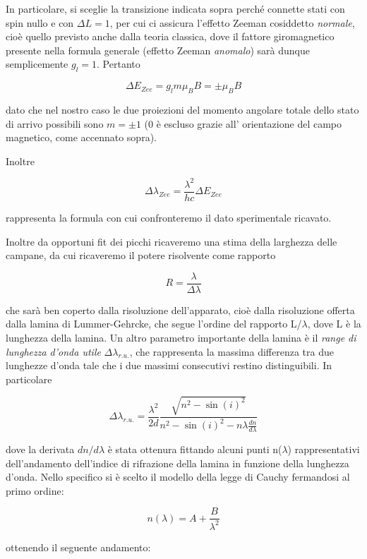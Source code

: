 \documentclass{article}
\begin{document}
	In particolare, si sceglie la transizione indicata sopra perché connette
	stati con spin nullo e con $\Delta L = 1$, per cui ci assicura l'effetto
	Zeeman cosiddetto \textit{normale}, cioè quello previsto anche dalla 
	teoria classica, dove il fattore giromagnetico presente nella formula 
	generale (effetto Zeeman \textit{anomalo}) sarà dunque semplicemente
	$g_l = 1$. Pertanto
	
	\[
	\Delta E_{Zee} = g_l m \mu_B B = \pm \mu_B B
	\]
	
	dato che nel nostro caso le due proiezioni del momento angolare totale
	dello stato di arrivo possibili sono $m = \pm 1$ (0 è escluso grazie all'
	orientazione del campo magnetico, come accennato sopra).
	
	Inoltre
	
	\[
	\Delta\lambda_{Zee} = \frac{\lambda^2}{hc}\Delta E_{Zee}
	\]
	
	rappresenta la formula con cui confronteremo il dato sperimentale
	ricavato.
	
	Inoltre da opportuni fit dei picchi ricaveremo una stima della larghezza
	delle campane, da cui ricaveremo il potere risolvente come rapporto
	
	\[
	R = \frac{\lambda}{\Delta\lambda}    
	\]
	
	che sarà ben coperto dalla risoluzione dell'apparato, cioè dalla
	risoluzione offerta dalla lamina di Lummer-Gehrcke, che segue l'ordine
	del rapporto L/$\lambda$, dove L è la lunghezza della lamina.
	Un altro parametro importante della lamina è il \textit{range di 
		lunghezza d'onda utile} $\Delta\lambda_{r.u.}$, che rappresenta la
	massima differenza tra due lunghezze d'onda tale che i due massimi 
	consecutivi restino distinguibili. In particolare
	
	\[
	\Delta\lambda_{r.u.} = \frac{\lambda^2}{2d}\frac{\sqrt{n^2-\sin(i)^2}}{n^2-\sin(i)^2-n\lambda\frac{dn}{d\lambda}}
	\]
	
	dove la derivata $dn/d\lambda$ è stata ottenura fittando alcuni punti 
	n($\lambda$) rappresentativi dell'andamento dell'indice di rifrazione
	della lamina in funzione della lunghezza d'onda. Nello specifico si è
	scelto il modello della legge di Cauchy fermandosi al primo ordine:

\[
n(\lambda) = A + \frac{B}{\lambda^2}    
\]

ottenendo il seguente andamento:
\end{document}
